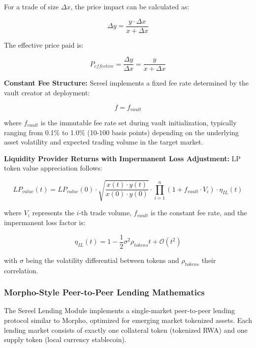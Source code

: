 \documentclass[12pt]{article}
\begin{document}
For a trade of size $\Delta x$, the price impact can be calculated as:

\begin{equation}
\Delta y = \frac{y \cdot \Delta x}{x + \Delta x}
\end{equation}

The effective price paid is:

\begin{equation}
P_{effective} = \frac{\Delta y}{\Delta x} = \frac{y}{x + \Delta x}
\end{equation}

\textbf{Constant Fee Structure:}
Sereel implements a fixed fee rate determined by the vault creator at deployment:

\begin{equation}
f = f_{vault}
\end{equation}

where $f_{vault}$ is the immutable fee rate set during vault initialization, typically ranging from 0.1\% to 1.0\% (10-100 basis points) depending on the underlying asset volatility and expected trading volume in the target market.

\textbf{Liquidity Provider Returns with Impermanent Loss Adjustment:}
LP token value appreciation follows:

\begin{equation}
LP_{value}(t) = LP_{value}(0) \cdot \sqrt{\frac{x(t) \cdot y(t)}{x(0) \cdot y(0)}} \cdot \prod_{i=1}^{n} (1 + f_{vault} \cdot V_i) \cdot \eta_{IL}(t)
\end{equation}

where $V_i$ represents the $i$-th trade volume, $f_{vault}$ is the constant fee rate, and the impermanent loss factor is:

\begin{equation}
\eta_{IL}(t) = 1 - \frac{1}{2} \sigma^2 \rho_{tokens} t + \mathcal{O}(t^2)
\end{equation}

with $\sigma$ being the volatility differential between tokens and $\rho_{tokens}$ their correlation.

\subsubsection{Morpho-Style Peer-to-Peer Lending Mathematics}

The Sereel Lending Module implements a single-market peer-to-peer lending protocol similar to Morpho, optimized for emerging market tokenized assets. Each lending market consists of exactly one collateral token (tokenized RWA) and one supply token (local currency stablecoin).
\end{document}

